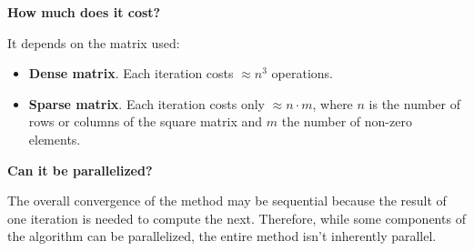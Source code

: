 \highspace
\begin{flushleft}
    \textcolor{Red2}{ \textbf{How much does it cost?}}
\end{flushleft}
It depends on the matrix used:
\begin{itemize}
    \item \textbf{Dense matrix}. Each iteration costs $\approx n^{3}$ operations.
    \item \textbf{Sparse matrix}. Each iteration costs only $\approx n \cdot m$, where $n$ is the number of rows or columns of the square matrix and $m$ the number of non-zero elements.
\end{itemize}

\highspace
\begin{flushleft}
    \textcolor{Green3}{ \textbf{Can it be parallelized?}}
\end{flushleft}
The overall convergence of the method may be sequential because the result of one iteration is needed to compute the next. Therefore, while some components of the algorithm can be parallelized, the entire method isn't inherently parallel.